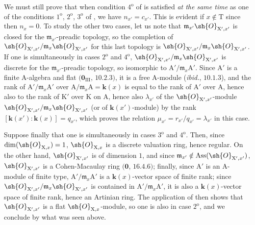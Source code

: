 \begin{env}[21.10.11]
\label{IV.21.10.11}
We must still prove that when condition $4^{\mathrm{o}}$ of  is satisfied \emph{at the same time} as one of the conditions $1^{\mathrm{o}}$, $2^{\mathrm{o}}$, $3^{\mathrm{o}}$ of , we have $n_{x'}=c_{x'}$.
This is evident if $x\notin\mathrm{T}$ since then $n_x=0$.
To study the other two cases, let us note that $\mathfrak{m}_{x'}\sh{O}_{\mathrm{X}',x'}$ is closed for the $\mathfrak{m}_{x'}$-preadic topology, so the completion of $\sh{O}_{\mathrm{X}',x'}/\mathfrak{m}_x\sh{O}_{\mathrm{X}',x'}$ for this last topology is $\sh{O}_{\mathrm{X}',x'}/\mathfrak{m}_x\sh{O}_{\mathrm{X}',x'}$.
If one is simultaneously in cases $2^{\mathrm{o}}$ and $4^{\mathrm{o}}$, $\sh{O}_{\mathrm{X}',x'}/\mathfrak{m}_x\sh{O}_{\mathrm{X}',x'}$ is discrete for the $\mathfrak{m}_{x'}$-preadic topology, so isomorphic to $\mathrm{A}'/\mathfrak{m}_x\mathrm{A}'$.
Since $\mathrm{A}'$ is a finite A-algebra and flat $(\mathbf{0}_{\mathrm{III}}$, $10.2.3)$, it is a free A-module (\emph{ibid.}, $10.1.3$), and the rank of $\mathrm{A}'/\mathfrak{m}_x\mathrm{A}'$ over $\mathrm{A}/\mathfrak{m}_x\mathrm{A}=\boldsymbol{k}(x)$ is equal to the rank of $\mathrm{A}'$ over $\mathrm{A}$, hence also to the rank of $\mathrm{K}'$ over $\mathrm{K}$ on $\mathrm{A}$, hence also $\lambda_{x'}$ of the $\sh{O}_{\mathrm{X}',x'}$-module $\sh{O}_{\mathrm{X}',x'}/\mathfrak{m}_x\sh{O}_{\mathrm{X}',x'}$ (or of $\boldsymbol{k}(x')$-module) by the rank $[\boldsymbol{k}(x'):\boldsymbol{k}(x)]=q_{x'}$, which proves the relation $\mu_{x'}=r_{x'}/q_{x'}=\lambda_{x'}$ in this case.

Suppose finally that one is simultaneously in cases $3^{\mathrm{o}}$ and $4^{\mathrm{o}}$.
Then, since $\dim(\sh{O}_{\mathrm{X},x})=1$, $\sh{O}_{\mathrm{X},x}$ is a discrete valuation ring, hence regular.
On the other hand, $\sh{O}_{\mathrm{X}',x'}$ is of dimension $1$, and since $\mathfrak{m}_{x'}\notin\operatorname{Ass}(\sh{O}_{\mathrm{X}',x'})$, $\sh{O}_{\mathrm{X}',x'}$ is a Cohen-Macaulay ring $(\mathbf{0}$, $16.4.6)$; finally, since $\mathrm{A}'$ is an A-module of finite type, $\mathrm{A}'/\mathfrak{m}_x\mathrm{A}'$ is a $\boldsymbol{k}(x)$-vector space of finite rank; since $\sh{O}_{\mathrm{X}',x'}/\mathfrak{m}_x\sh{O}_{\mathrm{X}',x'}$ is contained in $\mathrm{A}'/\mathfrak{m}_x\mathrm{A}'$, it is also a $\boldsymbol{k}(x)$-vector space of finite rank, hence an Artinian ring.
The application of  then shows that $\sh{O}_{\mathrm{X}',x'}$ is a flat $\sh{O}_{\mathrm{X},x}$-module, so one is also in case $2^{\mathrm{o}}$, and we conclude by what was seen above.


\end{env}
